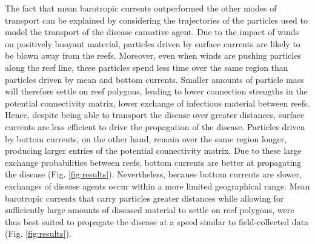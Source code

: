 The fact that mean barotropic currents outperformed the other modes of transport can be explained by considering the trajectories of the particles used to model the transport of the disease causative agent. Due to the impact of winds on positively buoyant material, particles driven by surface currents are likely to be blown away from the reefs. Moreover, even when winds are pushing particles along the reef line, these particles spend less time over the same region than particles driven by mean and bottom currents. Smaller amounts of particle mass will therefore settle on reef polygons, leading to lower connection strengths in the potential connectivity matrix, \ie lower exchange of infectious material between reefs. Hence, despite being able to transport the disease over greater distances, surface currents are less efficient to drive the propagation of the disease. Particles driven by bottom currents, on the other hand, remain over the same region longer, producing larger entries of the potential connectivity matrix. Due to these large exchange probabilities between reefs, bottom currents are better at propagating the disease (Fig. \ref{fig:results}). Nevertheless, because bottom currents are slower, exchanges of disease agents occur within a more limited geographical range. Mean barotropic currents that carry particles greater distances while allowing for sufficiently large amounts of diseased material to settle on reef polygons, were thus best suited to propagate the disease at a speed similar to field-collected data (Fig. \ref{fig:results}).

